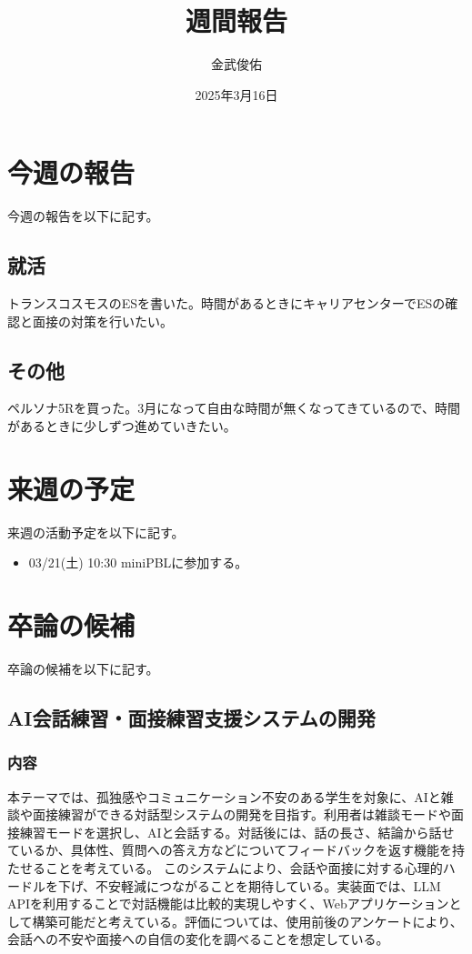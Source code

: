 \documentclass[a4paper,12pt]{ujarticle}
\title{週間報告}
\author{金武俊佑}
\date{2025年3月16日}
\begin{document}
\maketitle

\section{今週の報告}\label{sec:thisweek}
今週の報告を以下に記す。
\subsection{就活}\label{sec:job}
トランスコスモスのESを書いた。時間があるときにキャリアセンターでESの確認と面接の対策を行いたい。
\subsection{その他}\label{sec:other}
ペルソナ5Rを買った。3月になって自由な時間が無くなってきているので、時間があるときに少しずつ進めていきたい。
\section{来週の予定}\label{sec:nextweek}
来週の活動予定を以下に記す。
\begin{itemize}
  \item 03/21(土) 10:30 miniPBLに参加する。
\end{itemize}
\section{ 卒論の候補}\label{sec:soturon}
卒論の候補を以下に記す。

\subsection{AI会話練習・面接練習支援システムの開発}

\subsubsection{内容}
本テーマでは、孤独感やコミュニケーション不安のある学生を対象に、AIと雑談や面接練習ができる対話型システムの開発を目指す。利用者は雑談モードや面接練習モードを選択し、AIと会話する。対話後には、話の長さ、結論から話せているか、具体性、質問への答え方などについてフィードバックを返す機能を持たせることを考えている。
このシステムにより、会話や面接に対する心理的ハードルを下げ、不安軽減につながることを期待している。実装面では、LLM APIを利用することで対話機能は比較的実現しやすく、Webアプリケーションとして構築可能だと考えている。評価については、使用前後のアンケートにより、会話への不安や面接への自信の変化を調べることを想定している。
\end{document}
